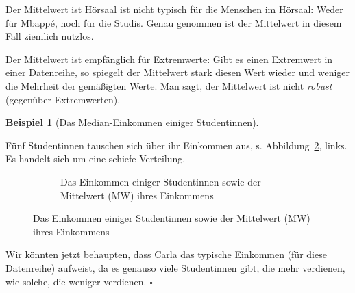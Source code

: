 \documentclass[
  letterpaper,
]{scrbook}
\theoremstyle{definition}
\theoremstyle{definition}
\newtheorem{example}{Beispiel}[chapter]
\theoremstyle{definition}
\theoremstyle{remark}
\begin{document}
Der Mittelwert ist Hörsaal ist nicht typisch für die Menschen im
Hörsaal: Weder für Mbappé, noch für die Studis. Genau genommen ist der
Mittelwert in diesem Fall ziemlich nutzlos.

Der Mittelwert ist empfänglich für Extremwerte: Gibt es einen Extremwert
in einer Datenreihe, so spiegelt der Mittelwert stark diesen Wert wieder
und weniger die Mehrheit der gemäßigten Werte. Man sagt, der Mittelwert
ist nicht \emph{robust} (gegenüber Extremwerten).

\begin{example}[Das Median-Einkommen einiger
Studentinnen]\protect\hypertarget{exm-med}{}\label{exm-med}

Fünf Studentinnen tauschen sich über ihr Einkommen aus, s.
Abbildung~\ref{fig-md1}, links. Es handelt sich um eine schiefe
Verteilung.

\begin{figure}

\begin{minipage}{\linewidth}

\begin{figure}[H]


\caption{\label{fig-md1}Das Einkommen einiger Studentinnen sowie der
Mittelwert (MW) ihres Einkommens}

\end{figure}%

\end{minipage}%

\end{figure}%

Wir könnten jetzt behaupten, dass Carla das typische Einkommen (für
diese Datenreihe) aufweist, da es genauso viele Studentinnen gibt, die
mehr verdienen, wie solche, die weniger verdienen. \(\square\)

\end{example}
\end{document}
